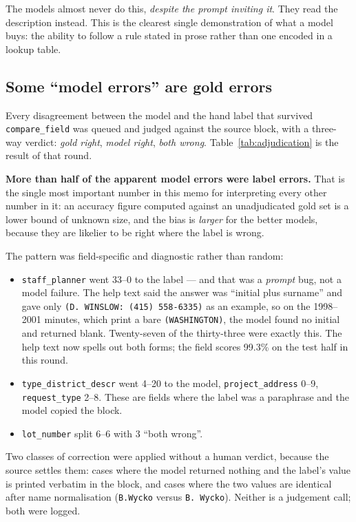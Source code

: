 \documentclass[11pt]{article}
\begin{document}
The models almost never do this, \emph{despite the prompt inviting it}. They read the
description instead. This is the clearest single demonstration of what a model buys: the
ability to follow a rule stated in prose rather than one encoded in a lookup table.

\subsection{Some ``model errors'' are gold errors}
\label{sec:golderrors}
\label{sec:adjudication}

Every disagreement between the model and the hand label that survived \texttt{compare\_field}
was queued and judged against the source block, with a three-way verdict: \emph{gold right},
\emph{model right}, \emph{both wrong}. Table~\ref{tab:adjudication} is the result of that
round.

\textbf{More than half of the apparent model errors were label errors.} That is the single
most important number in this memo for interpreting every other number in it: an accuracy
figure computed against an unadjudicated gold set is a lower bound of unknown size, and the
bias is \emph{larger} for the better models, because they are likelier to be right where the
label is wrong.

The pattern was field-specific and diagnostic rather than random:

\begin{itemize}
\item \texttt{staff\_planner} went 33--0 to the label --- and that was a \emph{prompt} bug,
not a model failure. The help text said the answer was ``initial plus surname'' and gave only
\texttt{(D. WINSLOW: (415) 558-6335)} as an example, so on the 1998--2001 minutes, which
print a bare \texttt{(WASHINGTON)}, the model found no initial and returned blank. Twenty-seven
of the thirty-three were exactly this. The help text now spells out both forms; the field
scores 99.3\% on the test half in this round.
\item \texttt{type\_district\_descr} went 4--20 to the model, \texttt{project\_address} 0--9,
\texttt{request\_type} 2--8. These are fields where the label was a paraphrase and the model
copied the block.
\item \texttt{lot\_number} split 6--6 with 3 ``both wrong''.
\end{itemize}

Two classes of correction were applied without a human verdict, because the source settles
them: cases where the model returned nothing and the label's value is printed verbatim in the
block, and cases where the two values are identical after name normalisation
(\texttt{B.Wycko} versus \texttt{B. Wycko}). Neither is a judgement call; both were logged.
\end{document}
